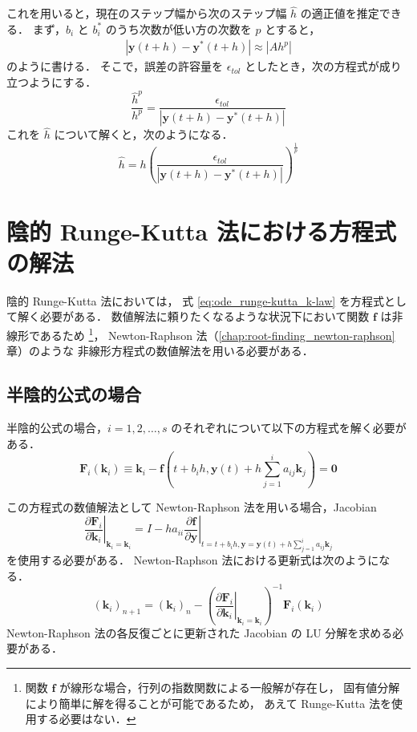 これを用いると，現在のステップ幅から次のステップ幅 $\hat{h}$ の適正値を推定できる．
まず，$b_i$ と $b_i^*$ のうち次数が低い方の次数を $p$ とすると，
\begin{align}
    \left| \bm{y}(t + h) - \bm{y}^*(t + h) \right| \approx |Ah^p|
\end{align}
のように書ける．
そこで，誤差の許容量を $\epsilon_{tol}$ としたとき，次の方程式が成り立つようにする．
\begin{equation}
    \frac{\hat{h}^p}{h^p} = \frac{\epsilon_{tol}}{\left| \bm{y}(t + h) - \bm{y}^*(t + h) \right|}
\end{equation}
これを $\hat{h}$ について解くと，次のようになる．
\begin{equation}
    \hat{h} = h \left(\frac{\epsilon_{tol}}{\left| \bm{y}(t + h) - \bm{y}^*(t + h) \right|}\right)^{\frac{1}{p}}
\end{equation}

\section{陰的 Runge-Kutta 法における方程式の解法}

陰的 Runge-Kutta 法においては，
式 \eqref{eq:ode_runge-kutta_k-law} を方程式として解く必要がある．
数値解法に頼りたくなるような状況下において関数 $\bm{f}$ は非線形であるため
\footnote{関数 $\bm{f}$ が線形な場合，行列の指数関数による一般解が存在し，%
    固有値分解により簡単に解を得ることが可能であるため，%
    あえて Runge-Kutta 法を使用する必要はない．}，
Newton-Raphson 法（\ref{chap:root-finding_newton-raphson} 章）のような
非線形方程式の数値解法を用いる必要がある．

\subsection{半陰的公式の場合}

半陰的公式の場合，$i = 1, 2, \ldots, s$ のそれぞれについて以下の方程式を解く必要がある．
\begin{equation}
    \bm{F}_i(\bm{k}_i)
    \equiv \bm{k}_i - \bm{f}\left(t + b_i h, \bm{y}(t) + h \sum_{j = 1}^i a_{ij} \bm{k}_j \right)
    = \bm{0}
\end{equation}

この方程式の数値解法として
Newton-Raphson 法を用いる場合，Jacobian
\begin{equation}
    \left. \frac{\partial \bm{F}_i}{\partial \bm{k}_i} \right|_{\bm{k}_i = \bm{k}_i}
    = I - h a_{ii}
    \left. \frac{\partial \bm{f}}{\partial \bm{y}}
    \right|_{t = t + b_i h, \bm{y} = \bm{y}(t) + h \sum_{j = 1}^i a_{ij} \bm{k}_j}
\end{equation}
を使用する必要がある．
Newton-Raphson 法における更新式は次のようになる．
\begin{equation}
    (\bm{k}_i)_{n+1} = (\bm{k}_i)_{n}
    - \left(\left. \frac{\partial \bm{F}_i}{\partial \bm{k}_i} \right|_{\bm{k}_i = \bm{k}_i}\right)^{-1}
    \bm{F}_i(\bm{k}_i)
\end{equation}
Newton-Raphson 法の各反復ごとに更新された Jacobian の LU 分解を求める必要がある．

